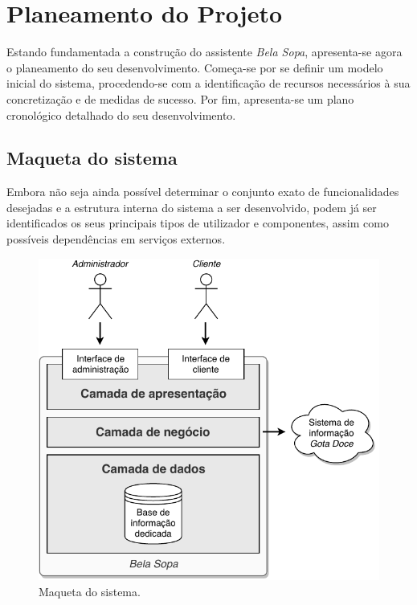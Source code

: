 
\section{Planeamento do Projeto}
\label{cap:planeamento}

Estando fundamentada a construção do assistente \emph{Bela Sopa}, apresenta-se agora o planeamento do seu desenvolvimento. Começa-se por se definir um modelo inicial do sistema, procedendo-se com a identificação de recursos necessários à sua concretização e de medidas de sucesso. Por fim, apresenta-se um plano cronológico detalhado do seu desenvolvimento.


\subsection{Maqueta do sistema}
\label{cap:planeamento:maqueta}

Embora não seja ainda possível determinar o conjunto exato de funcionalidades desejadas e a estrutura interna do sistema a ser desenvolvido, podem já ser identificados os seus principais tipos de utilizador e componentes, assim como possíveis dependências em serviços externos.

\begin{figure}[ht]
  \centering
  \includegraphics{figures/03/maqueta.pdf}
  \caption{Maqueta do sistema.}
  \label{fig:planeamento:maqueta}
\end{figure}

